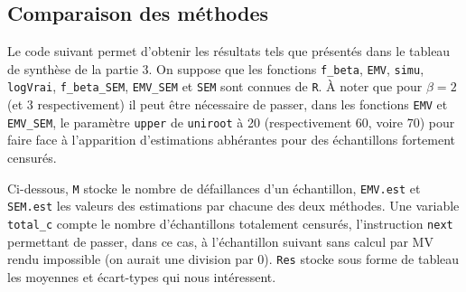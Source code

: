 \documentclass[a4paper]{report}
\begin{document}
\begin{appendix}
  \chapter{Comparaison des méthodes}
  \label{comp}
  Le code suivant permet d'obtenir les résultats tels que présentés dans le tableau de synthèse de la partie 3. On suppose que les fonctions \verb|f_beta|, \verb|EMV|, \verb|simu|, \verb|logVrai|, \verb|f_beta_SEM|, \verb|EMV_SEM| et \verb|SEM| sont connues de \verb|R|. À noter que pour $\beta=2$ (et 3 respectivement) il peut être nécessaire de passer, dans les fonctions \verb|EMV| et \verb|EMV_SEM|, le paramètre \verb|upper| de \verb|uniroot| à 20 (respectivement 60, voire 70) pour faire face à l'apparition d'estimations abhérantes pour des échantillons fortement censurés. 
  
 Ci-dessous, \verb|M| stocke le nombre de défaillances d'un échantillon, \verb|EMV.est| et \verb|SEM.est| les valeurs des estimations par chacune des deux méthodes. Une variable \verb|total_c| compte le nombre d'échantillons totalement censurés, l'instruction \verb|next| permettant de passer, dans ce cas, à l'échantillon suivant sans calcul par MV rendu impossible (on aurait une division par 0). \verb|Res| stocke sous forme de tableau les moyennes et écart-types qui nous intéressent. 
    
    
  \end{appendix}
\end{document}

